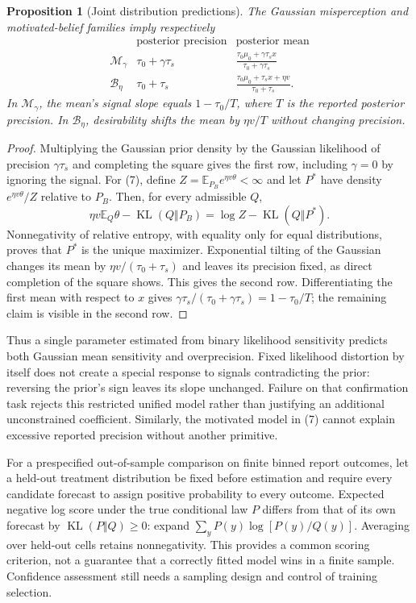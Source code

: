 \documentclass[11pt]{article}
\newtheorem{proposition}[theorem]{Proposition}
\theoremstyle{remark}
\newcommand{\E}{\mathbb E}
\newcommand{\KL}{\operatorname{KL}}
\begin{document}
\begin{proposition}[Joint distribution predictions]
The Gaussian misperception and motivated-belief families imply respectively
\[
\begin{array}{c|c|c}
 &\text{posterior precision}&\text{posterior mean}\\ \hline
 \mathcal M_\gamma &\tau_0+\gamma\tau_s&
       \displaystyle\frac{\tau_0\mu_0+\gamma\tau_sx}{\tau_0+\gamma\tau_s}\\[6pt]
 \mathcal B_\eta&\tau_0+\tau_s&
       \displaystyle\frac{\tau_0\mu_0+\tau_sx+\eta v}{\tau_0+\tau_s}.
\end{array}                                                   \tag{8}
\]
In $\mathcal M_\gamma$, the mean's signal slope equals $1-\tau_0/T$, where $T$ is the reported posterior precision. In $\mathcal B_\eta$, desirability shifts the mean by $\eta v/T$ without changing precision.
\end{proposition}
\begin{proof}
Multiplying the Gaussian prior density by the Gaussian likelihood of precision $\gamma\tau_s$ and completing the square gives the first row, including $\gamma=0$ by ignoring the signal. For (7), define $Z=\E_{P_B}e^{\eta v\theta}<\infty$ and let $P^*$ have density $e^{\eta v\theta}/Z$ relative to $P_B$. Then, for every admissible $Q$,
\[
 \eta v\E_Q\theta-\KL(Q\Vert P_B)=\log Z-\KL(Q\Vert P^*).
\]
Nonnegativity of relative entropy, with equality only for equal distributions, proves that $P^*$ is the unique maximizer. Exponential tilting of the Gaussian changes its mean by $\eta v/(\tau_0+\tau_s)$ and leaves its precision fixed, as direct completion of the square shows. This gives the second row. Differentiating the first mean with respect to $x$ gives $\gamma\tau_s/(\tau_0+\gamma\tau_s)=1-\tau_0/T$; the remaining claim is visible in the second row.
\end{proof}

Thus a single parameter estimated from binary likelihood sensitivity predicts both Gaussian mean sensitivity and overprecision. Fixed likelihood distortion by itself does not create a special response to signals contradicting the prior: reversing the prior's sign leaves its slope unchanged. Failure on that confirmation task rejects this restricted unified model rather than justifying an additional unconstrained coefficient. Similarly, the motivated model in (7) cannot explain excessive reported precision without another primitive.

For a prespecified out-of-sample comparison on finite binned report outcomes, let a held-out treatment distribution be fixed before estimation and require every candidate forecast to assign positive probability to every outcome. Expected negative log score under the true conditional law $P$ differs from that of its own forecast by $\KL(P\Vert Q)\geq0$: expand $\sum_yP(y)\log[P(y)/Q(y)]$. Averaging over held-out cells retains nonnegativity. This provides a common scoring criterion, not a guarantee that a correctly fitted model wins in a finite sample. Confidence assessment still needs a sampling design and control of training selection.
\end{document}
